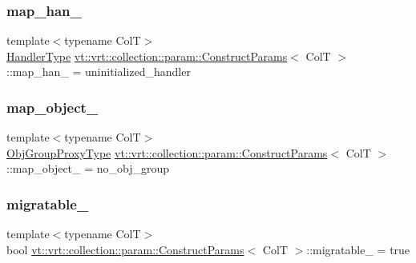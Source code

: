 \subsubsection{\texorpdfstring{map\+\_\+han\+\_\+}{map\_han\_}}
{\footnotesize\ttfamily template$<$typename ColT$>$ \\
\hyperlink{namespacevt_af64846b57dfcaf104da3ef6967917573}{Handler\+Type} \hyperlink{structvt_1_1vrt_1_1collection_1_1param_1_1_construct_params}{vt\+::vrt\+::collection\+::param\+::\+Construct\+Params}$<$ ColT $>$\+::map\+\_\+han\+\_\+ = uninitialized\+\_\+handler\hspace{0.3cm}{\ttfamily [private]}}

\mbox{\label{structvt_1_1vrt_1_1collection_1_1param_1_1_construct_params_a91859be49e51c141fd83e27499d5d582}} 
\subsubsection{\texorpdfstring{map\+\_\+object\+\_\+}{map\_object\_}}
{\footnotesize\ttfamily template$<$typename ColT$>$ \\
\hyperlink{namespacevt_ad7cae989df485fccca57f0792a880a8e}{Obj\+Group\+Proxy\+Type} \hyperlink{structvt_1_1vrt_1_1collection_1_1param_1_1_construct_params}{vt\+::vrt\+::collection\+::param\+::\+Construct\+Params}$<$ ColT $>$\+::map\+\_\+object\+\_\+ = no\+\_\+obj\+\_\+group\hspace{0.3cm}{\ttfamily [private]}}

\mbox{\label{structvt_1_1vrt_1_1collection_1_1param_1_1_construct_params_a811d67f8d46e6b6ad2736bba81201354}} 
\subsubsection{\texorpdfstring{migratable\+\_\+}{migratable\_}}
{\footnotesize\ttfamily template$<$typename ColT$>$ \\
bool \hyperlink{structvt_1_1vrt_1_1collection_1_1param_1_1_construct_params}{vt\+::vrt\+::collection\+::param\+::\+Construct\+Params}$<$ ColT $>$\+::migratable\+\_\+ = true\hspace{0.3cm}{\ttfamily [private]}}


